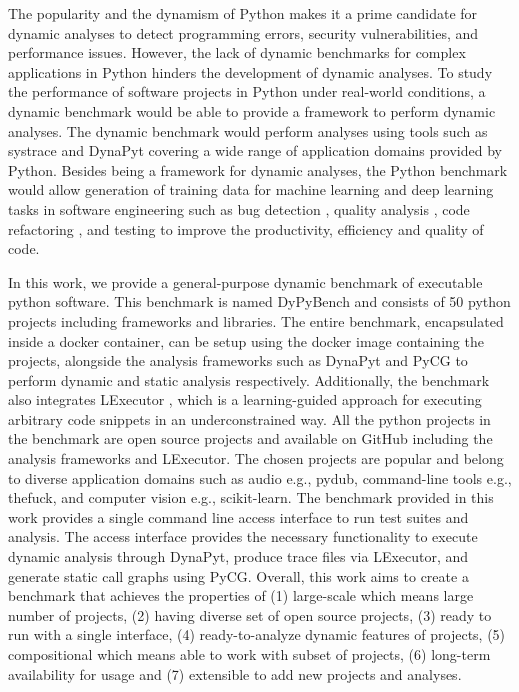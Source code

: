 The popularity and the dynamism of Python makes it a prime candidate for dynamic analyses to detect programming errors, security vulnerabilities, and performance issues. 
However, the lack of dynamic benchmarks for complex applications in Python hinders the development of dynamic analyses.
To study the performance of software projects in Python under real-world conditions, a dynamic benchmark would be able to provide a framework to perform dynamic analyses.
The dynamic benchmark would perform analyses using tools such as systrace \cite{systrace} and DynaPyt \cite{DynaPyt2022} covering a wide range of application domains provided by Python.
Besides being a framework for dynamic analyses, the Python benchmark would allow generation of training data for machine learning and deep learning tasks in software engineering such as bug detection \cite{DeepBugs2018}, quality analysis \cite{Code_analysis_1, Code_analysis_2}, code refactoring \cite{code_refactoring}, and testing \cite{testing_1, testing_2, testing_3} to improve the productivity, efficiency and quality of code.

In this work, we provide a general-purpose dynamic benchmark of executable python software. This benchmark is named DyPyBench and consists of 50 python projects including frameworks and libraries.
The entire benchmark, encapsulated inside a docker container, can be setup using the docker image containing the projects, alongside the analysis frameworks such as DynaPyt \cite{DynaPyt2022} and PyCG \cite{PyCG_2021} to perform dynamic and static analysis respectively. Additionally, the benchmark also integrates LExecutor \cite{LExecutor_2023}, which is a learning-guided approach for executing arbitrary code snippets in an underconstrained way. 
All the python projects in the benchmark are open source projects and available on GitHub \cite{github} including the analysis frameworks and LExecutor.
The chosen projects are popular and belong to diverse application domains such as audio e.g., pydub, command-line tools e.g., thefuck, and computer vision e.g., scikit-learn.
The benchmark provided in this work provides a single command line access interface to run test suites and analysis.
The access interface provides the necessary functionality to execute dynamic analysis through DynaPyt, produce trace files via LExecutor, and generate static call graphs using PyCG.
Overall, this work aims to create a benchmark that achieves the properties of (1) large-scale which means large number of projects, (2) having diverse set of open source projects, (3) ready to run with a single interface, (4) ready-to-analyze dynamic features of projects, (5) compositional which means able to work with subset of projects, (6) long-term availability for usage and (7) extensible to add new projects and analyses. 

